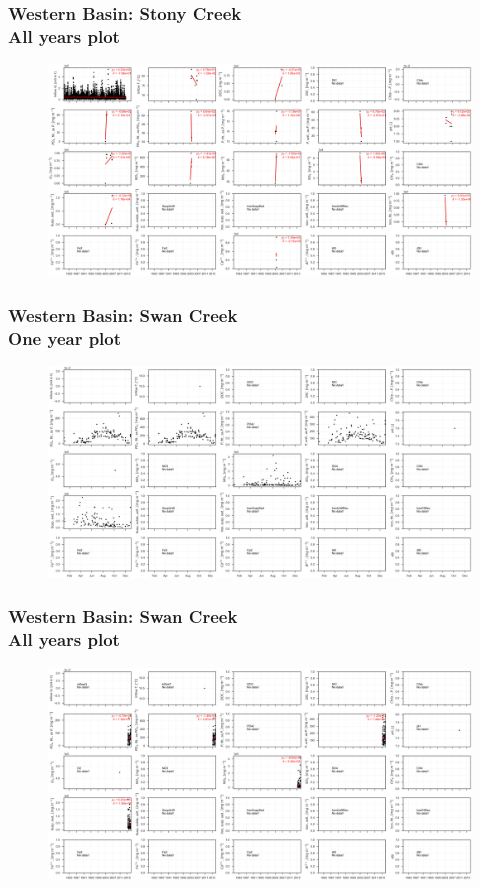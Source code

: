 \documentclass{beamer}
\begin{document}
\begin{frame}
\frametitle{Western Basin: Stony Creek\\ All years plot}
\begin{figure}
\includegraphics[width=\textwidth]{rivers/Western basin/plot_all stonycreek.png}
\end{figure}
\end{frame}

\begin{frame}
\frametitle{Western Basin: Swan Creek\\ One year plot}
\begin{figure}
\includegraphics[width=\textwidth]{rivers/Western basin/plot_1yr swancreek.png}
\end{figure}
\end{frame}

\begin{frame}
\frametitle{Western Basin: Swan Creek\\ All years plot}
\begin{figure}
\includegraphics[width=\textwidth]{rivers/Western basin/plot_all swancreek.png}
\end{figure}
\end{frame}
\end{document}
